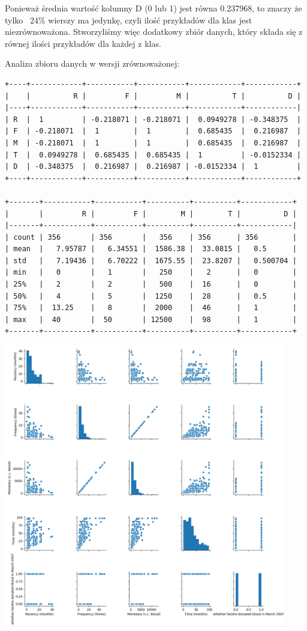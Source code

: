 \documentclass[11pt, a4paper, notitlepage]{report}
\begin{document}
Ponieważ średnia wartość kolumny D (0 lub 1) jest równa 0.237968, to znaczy że tylko ~24\% wierszy ma jedynkę, czyli ilość przykładów dla klas jest niezrównoważona.
Stworzyliśmy więc dodatkowy zbiór danych, który składa się z równej ilości przykładów dla każdej z klas.

\newpage

Analiza zbioru danych w wersji zrównoważonej:

\begin{verbatim}
+----+------------+-----------+-----------+------------+------------+
|    |          R |         F |         M |          T |          D |
|----+------------+-----------+-----------+------------+------------|
| R  |  1         | -0.218071 | -0.218071 |  0.0949278 | -0.348375  |
| F  | -0.218071  |  1        |  1        |  0.685435  |  0.216987  |
| M  | -0.218071  |  1        |  1        |  0.685435  |  0.216987  |
| T  |  0.0949278 |  0.685435 |  0.685435 |  1         | -0.0152334 |
| D  | -0.348375  |  0.216987 |  0.216987 | -0.0152334 |  1         |
+----+------------+-----------+-----------+------------+------------+

+-------+-----------+-----------+----------+----------+------------+
|       |         R |         F |        M |        T |          D |
|-------+-----------+-----------+----------+----------+------------|
| count | 356       | 356       |   356    | 356      | 356        |
| mean  |   7.95787 |   6.34551 |  1586.38 |  33.0815 |   0.5      |
| std   |   7.19436 |   6.70222 |  1675.55 |  23.8207 |   0.500704 |
| min   |   0       |   1       |   250    |   2      |   0        |
| 25%   |   2       |   2       |   500    |  16      |   0        |
| 50%   |   4       |   5       |  1250    |  28      |   0.5      |
| 75%   |  13.25    |   8       |  2000    |  46      |   1        |
| max   |  40       |  50       | 12500    |  98      |   1        |
+-------+-----------+-----------+----------+----------+------------+
\end{verbatim}

\includegraphics[width=350pt]{graphics/correlation_2} \\
\end{document}
